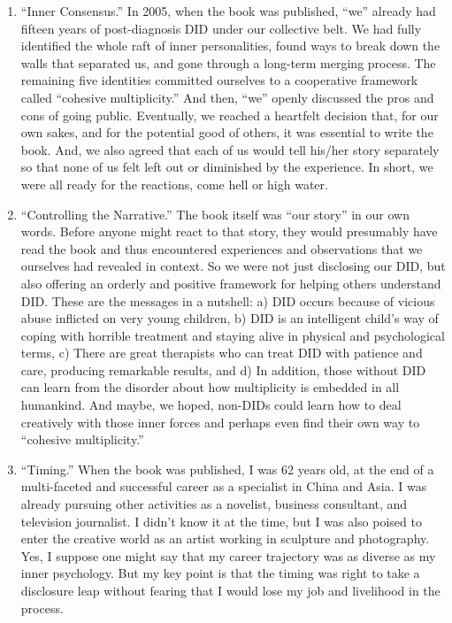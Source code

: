 \documentclass[]{book}
\begin{document}
\begin{enumerate}
\def\labelenumi{\arabic{enumi}.}
\item
  ``Inner Consensus.'' In 2005, when the book was published, ``we'' already had fifteen years of post-diagnosis DID under our collective belt. We had fully identified the whole raft of inner personalities, found ways to break down the walls that separated us, and gone through a long-term merging process. The remaining five identities committed ourselves to a cooperative framework called ``cohesive multiplicity.'' And then, ``we'' openly discussed the pros and cons of going public. Eventually, we reached a heartfelt decision that, for our own sakes, and for the potential good of others, it was essential to write the book. And, we also agreed that each of us would tell his/her story separately so that none of us felt left out or diminished by the experience. In short, we were all ready for the reactions, come hell or high water.
\item
  ``Controlling the Narrative.'' The book itself was ``our story'' in our own words. Before anyone might react to that story, they would presumably have read the book and thus encountered experiences and observations that we ourselves had revealed in context. So we were not just disclosing our DID, but also offering an orderly and positive framework for helping others understand DID. These are the messages in a nutshell: a) DID occurs because of vicious abuse inflicted on very young children, b) DID is an intelligent child's way of coping with horrible treatment and staying alive in physical and psychological terms, c) There are great therapists who can treat DID with patience and care, producing remarkable results, and d) In addition, those without DID can learn from the disorder about how multiplicity is embedded in all humankind. And maybe, we hoped, non-DIDs could learn how to deal creatively with those inner forces and perhaps even find their own way to ``cohesive multiplicity.''
\item
  ``Timing.'' When the book was published, I was 62 years old, at the end of a multi-faceted and successful career as a specialist in China and Asia. I was already pursuing other activities as a novelist, business consultant, and television journalist. I didn't know it at the time, but I was also poised to enter the creative world as an artist working in sculpture and photography. Yes, I suppose one might say that my career trajectory was as diverse as my inner psychology. But my key point is that the timing was right to take a disclosure leap without fearing that I would lose my job and livelihood in the process.

\end{enumerate}
\end{document}
